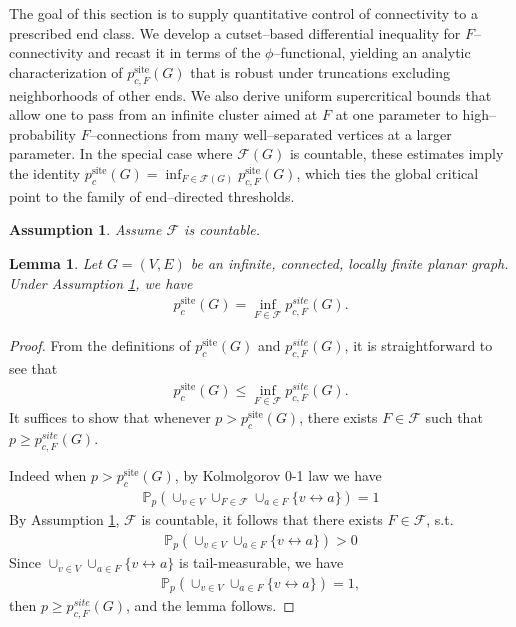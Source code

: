 \documentclass[11pt]{amsart}
\theoremstyle{plain}
\newtheorem{lemma}[theorem]{Lemma}
\newtheorem{assumption}[theorem]{Assumption}
\numberwithin{equation}{section}
\numberwithin{figure}{section}
\newcommand\PP{{\mathbb P}}
\newcommand\pcs{{p_c^{\mathrm{site}}}}
\begin{document}
The goal of this section is to supply quantitative control of connectivity to a prescribed end class.
We develop a cutset--based differential inequality for $F$--connectivity and recast it in terms of the
$\phi$--functional, yielding an analytic characterization of $p^{\mathrm{site}}_{c,F}(G)$ that is robust
under truncations excluding neighborhoods of other ends.
We also derive uniform supercritical bounds that allow one to pass from an infinite cluster aimed at $F$
at one parameter to high--probability $F$--connections from many well--separated vertices at a larger
parameter.  In the special case where $\mathcal F(G)$ is countable, these estimates imply the identity
$p^{\mathrm{site}}_c(G)=\inf_{F\in\mathcal F(G)}p^{\mathrm{site}}_{c,F}(G)$, which ties the global critical point
to the family of end--directed thresholds.



\begin{assumption}\label{ap36} Assume $\mathcal{F}$ is countable.
\end{assumption}

\begin{lemma}Let $G=(V,E)$ be an infinite, connected, locally finite planar graph. Under Assumption \ref{ap36}, we have
\begin{align*}
\pcs(G)=\inf_{F\in\mathcal{F}}p_{c,F}^{site}(G).
\end{align*}
\end{lemma}

\begin{proof}From the definitions of $\pcs(G)$ and $p_{c,F}^{site}(G)$, it is straightforward to see that
\begin{align*}
\pcs(G)\leq\inf_{F\in\mathcal{F}} p_{c,F}^{site}(G).
\end{align*}
It suffices to show that whenever $p>\pcs(G)$, there exists $F\in\mathcal{F}$ such that $p\geq p_{c,F}^{site}(G)$. 

Indeed 
when $p>\pcs(G)$, by Kolmolgorov 0-1 law we have 
\begin{align*}
\PP_p(\cup_{v\in V}\cup_{F\in \mathcal{F}}\cup_{a\in F}\{v\leftrightarrow a\})=1
\end{align*}
By Assumption \ref{ap36}, $\mathcal{F}$ is countable, it follows that there exists $F\in \mathcal{F}$, s.t.
\begin{align*}
\PP_p(\cup_{v\in V}\cup_{a\in F}\{v\leftrightarrow a\})>0
\end{align*}
Since $\cup_{v\in V}\cup_{a\in F}\{v\leftrightarrow a\}$ is tail-measurable, we have
\begin{align*}
\PP_p(\cup_{v\in V}\cup_{a\in  F}\{v\leftrightarrow a\})=1,
\end{align*}
then $p\geq p_{c,F}^{site}(G)$, and the lemma follows.
\end{proof}
\end{document}
